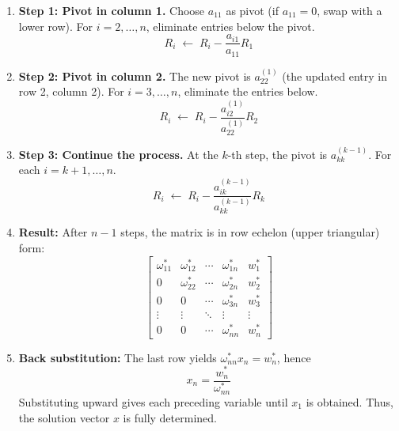 \documentclass[../../../main.tex]{subfiles}
\begin{document}
\begin{enumerate}
    \item \textbf{Step 1: Pivot in column 1.}
          Choose $a_{11}$ as pivot (if $a_{11}=0$, swap with a lower row).
          For $i=2,\dots,n$, eliminate entries below the pivot.
          \begin{equation*}
              R_i \;\leftarrow\; R_i - \frac{a_{i1}}{a_{11}} R_1
          \end{equation*}
    \item \textbf{Step 2: Pivot in column 2.}
          The new pivot is $a_{22}^{(1)}$ (the updated entry in row 2, column 2).
          For $i=3,\dots,n$, eliminate the entries below.
          \begin{equation*}
              R_i \;\leftarrow\; R_i - \frac{a_{i2}^{(1)}}{a_{22}^{(1)}} R_2
          \end{equation*}
    \item \textbf{Step 3: Continue the process.}  At the $k$-th step, the pivot is $a_{kk}^{(k-1)}$.
          For each $i = k+1, \dots, n$.
          \begin{equation*}
              R_i \;\leftarrow\; R_i - \frac{a_{ik}^{(k-1)}}{a_{kk}^{(k-1)}} R_k
          \end{equation*}
    \item \textbf{Result:}
          After $n-1$ steps, the matrix is in row echelon (upper triangular) form:
          \[
              \begin{bmatrix}
                  \omega_{11}^{*} & \omega_{12}^{*} & \cdots & \omega_{1n}^{*} & w_1^{*} \\
                  0               & \omega_{22}^{*} & \cdots & \omega_{2n}^{*} & w_2^{*} \\
                  0               & 0               & \cdots & \omega_{3n}^{*} & w_3^{*} \\
                  \vdots          & \vdots          & \ddots & \vdots          & \vdots  \\
                  0               & 0               & \cdots & \omega_{nn}^{*} & w_n^{*}
              \end{bmatrix}
          \]

    \item \textbf{Back substitution:}
          The last row yields $\omega_{nn}^{*} x_n = w_n^{*}$, hence
          \[
              x_n = \frac{w_n^{*}}{\omega_{nn}^{*}}
          \]
          Substituting upward gives each preceding variable until $x_1$ is obtained.
          Thus, the solution vector $x$ is fully determined.
\end{enumerate}
\end{document}
